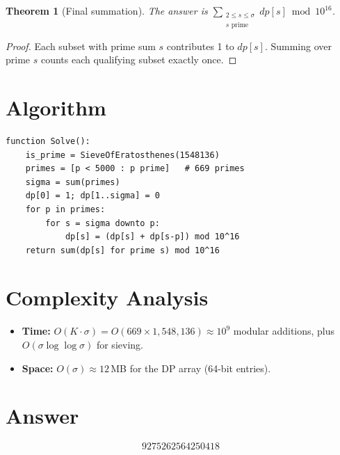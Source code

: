 \documentclass[12pt]{article}
\newtheorem{theorem}{Theorem}
\begin{document}
\begin{theorem}[Final summation]\label{thm:sum}
The answer is $\sum_{\substack{2\le s\le\sigma\\s\text{ prime}}}dp[s]\bmod 10^{16}$.
\end{theorem}

\begin{proof}
Each subset with prime sum $s$ contributes 1 to $dp[s]$. Summing over prime $s$ counts each qualifying subset exactly once.
\end{proof}

\section{Algorithm}

\begin{verbatim}
function Solve():
    is_prime = SieveOfEratosthenes(1548136)
    primes = [p < 5000 : p prime]   # 669 primes
    sigma = sum(primes)
    dp[0] = 1; dp[1..sigma] = 0
    for p in primes:
        for s = sigma downto p:
            dp[s] = (dp[s] + dp[s-p]) mod 10^16
    return sum(dp[s] for prime s) mod 10^16
\end{verbatim}

\section{Complexity Analysis}

\begin{itemize}
\item \textbf{Time:} $O(K\cdot\sigma)=O(669\times 1{,}548{,}136)\approx 10^9$ modular additions, plus $O(\sigma\log\log\sigma)$ for sieving.
\item \textbf{Space:} $O(\sigma)\approx 12$\,MB for the DP array (64-bit entries).
\end{itemize}

\section{Answer}

\[
\boxed{9275262564250418}
\]
\end{document}
